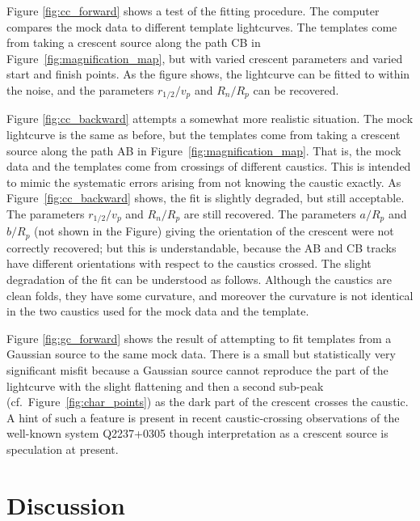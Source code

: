 \documentclass[usenatbib]{mn2e}
\begin{document}
Figure \ref{fig:cc_forward} shows a test of the fitting procedure.
The computer compares the mock data to different template
lightcurves. The templates come from taking a crescent source along
the path CB in Figure~\ref{fig:magnification_map}, but with varied
crescent parameters and varied start and finish points.  As the figure
shows, the lightcurve can be fitted to within the noise, and the
parameters $r_{1/2}/v_p$ and $R_n/R_p$ can be recovered.

Figure \ref{fig:cc_backward} attempts a somewhat more realistic
situation.  The mock lightcurve is the same as before, but the
templates come from taking a crescent source along the path AB in
Figure~\ref{fig:magnification_map}.  That is, the mock data and the
templates come from crossings of different caustics.  This is intended
to mimic the systematic errors arising from not knowing the caustic
exactly.  As Figure~\ref{fig:cc_backward} shows, the fit is slightly
degraded, but still acceptable.  The parameters $r_{1/2}/v_p$ and
$R_n/R_p$ are still recovered.  The parameters $a/R_p$ and $b/R_p$
(not shown in the Figure) giving the orientation of the crescent were
not correctly recovered; but this is understandable, because the AB
and CB tracks have different orientations with respect to the caustics
crossed.  The slight degradation of the fit can be understood as
follows.  Although the caustics are clean folds, they have some
curvature, and moreover the curvature is not identical in the two
caustics used for the mock data and the template.  

Figure \ref{fig:gc_forward} shows the result of attempting to fit
templates from a Gaussian source to the same mock data.  There is a
small but statistically very significant misfit because a Gaussian
source cannot reproduce the part of the lightcurve with the slight
flattening and then a second sub-peak
(cf.~Figure~\ref{fig:char_points}) as the dark part of the crescent
crosses the caustic.  A hint of such a feature is present in recent
caustic-crossing observations of the well-known system Q2237+0305
\citep[see Figure~3 in][]{2015ApJ...814L..26M} though interpretation
as a crescent source is speculation at present.

\section{Discussion}\label{sec:discussion}
\end{document}
